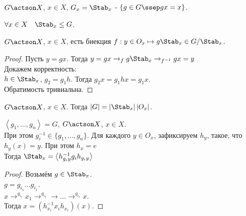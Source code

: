 \documentclass[11pt, oneside]{article}   	%
\begin{document}
    \begin{definition}
        $G\actson X$,  $x\in X$, $G_x = \Stab_{x}$ - $\{g\in G\ssep gx=x\} $.
    \end{definition}
    \begin{dlemma}
        $\forall{x\in X}\quad \Stab_{x} \le G$.
    \end{dlemma}
    \begin{theorem}
        $G\actson X$,  $x\in X$, есть биекция $f : y\in O_x \mapsto g\Stab_{x}\in G/\Stab_{x}$.
        \begin{proof}
            Пусть $y=gx$. Тогда  $y = gx \to_{f} g\Stab_{x} \to_{f^{-1}} gx = y$\\
           Докажем корректность:\\
           $h\in \Stab_{x}$, $g_2 = g_1h$. Тогда $g_2x = g_1hx = g_1x$.\\
           Обратимость тривиальна.
        \end{proof}
    \end{theorem}
    \begin{tlemma}
        $G\actson X$,  $x\in X$. Тогда $\left|G\right| = \left|\Stab_x\right| \left|O_{x}\right|$.
    \end{tlemma}
    \begin{tlemma}
        $\left<g_1, \ldots, g_n\right> = G$, $G\actson X$,  $x\in X$.\\
        При этом $g_i^{-1}\in \{g_1, \ldots, g_n\} $.
        Для каждого $y\in O_x$, зафиксируем $h_y$, такое, что $h_y(x) = y$. При этом $h_x = e$\\
        Тогда $\Stab_{x} = \left<h_{g_{i}y}^{-1}g_ih_{g_{i}y}\right>$
        \begin{proof}
            Возьмём $g\in \Stab_{x}$.\\
            $g = g_{i_s}\ldots g_{i_1}$.\\
            $x \to^{g_{i_1}} x_1 \to^{g_{i_2}} \to \ldots \to^{g_{i_s}} x$.\\
            Тогда $x = (h_{x_i}^{-1} x_i h_{x_i})(x)$.
        \end{proof}
    \end{tlemma}
\end{document}
